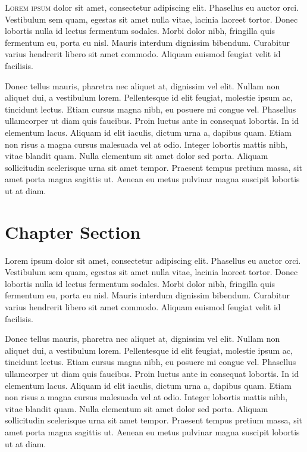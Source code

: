 \lettrine[lines=3]{L}{orem ipsum} dolor sit amet, consectetur adipiscing elit. Phasellus eu auctor orci. Vestibulum sem quam, egestas sit amet nulla vitae, lacinia laoreet tortor. Donec lobortis nulla id lectus fermentum sodales. Morbi dolor nibh, fringilla quis fermentum eu, porta eu nisl. Mauris interdum dignissim bibendum. Curabitur varius hendrerit libero sit amet commodo. Aliquam euismod feugiat velit id facilisis.

Donec tellus mauris, pharetra nec aliquet at, dignissim vel elit. Nullam non aliquet dui, a vestibulum lorem. Pellentesque id elit feugiat, molestie ipsum ac, tincidunt lectus. Etiam cursus magna nibh, eu posuere mi congue vel. Phasellus ullamcorper ut diam quis faucibus. Proin luctus ante in consequat lobortis. In id elementum lacus. Aliquam id elit iaculis, dictum urna a, dapibus quam. Etiam non risus a magna cursus malesuada vel at odio. Integer lobortis mattis nibh, vitae blandit quam. Nulla elementum sit amet dolor sed porta. Aliquam sollicitudin scelerisque urna sit amet tempor. Praesent tempus pretium massa, sit amet porta magna sagittis ut. Aenean eu metus pulvinar magna suscipit lobortis ut at diam.

\section{Chapter Section}
Lorem ipsum dolor sit amet, consectetur adipiscing elit. Phasellus eu auctor orci. Vestibulum sem quam, egestas sit amet nulla vitae, lacinia laoreet tortor. Donec lobortis nulla id lectus fermentum sodales. Morbi dolor nibh, fringilla quis fermentum eu, porta eu nisl. Mauris interdum dignissim bibendum. Curabitur varius hendrerit libero sit amet commodo. Aliquam euismod feugiat velit id facilisis.

Donec tellus mauris, pharetra nec aliquet at, dignissim vel elit. Nullam non aliquet dui, a vestibulum lorem. Pellentesque id elit feugiat, molestie ipsum ac, tincidunt lectus. Etiam cursus magna nibh, eu posuere mi congue vel. Phasellus ullamcorper ut diam quis faucibus. Proin luctus ante in consequat lobortis. In id elementum lacus. Aliquam id elit iaculis, dictum urna a, dapibus quam. Etiam non risus a magna cursus malesuada vel at odio. Integer lobortis mattis nibh, vitae blandit quam. Nulla elementum sit amet dolor sed porta. Aliquam sollicitudin scelerisque urna sit amet tempor. Praesent tempus pretium massa, sit amet porta magna sagittis ut. Aenean eu metus pulvinar magna suscipit lobortis ut at diam.